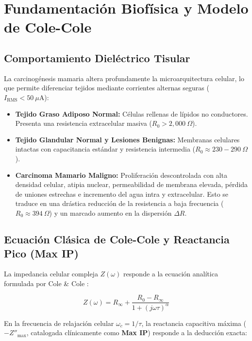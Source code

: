 \documentclass[11pt,a4paper]{article}
\begin{document}
\section{Fundamentación Biofísica y Modelo de Cole-Cole}

\subsection{Comportamiento Dieléctrico Tisular}
La carcinogénesis mamaria altera profundamente la microarquitectura celular, lo que permite diferenciar tejidos mediante corrientes alternas seguras ($I_{\text{RMS}} < 50\ \mu\text{A}$):
\begin{itemize}
    \item \textbf{Tejido Graso Adiposo Normal:} Células rellenas de lípidos no conductores. Presenta una resistencia extracelular masiva ($R_0 > 2,000\ \Omega$).
    \item \textbf{Tejido Glandular Normal y Lesiones Benignas:} Membranas celulares intactas con capacitancia estándar y resistencia intermedia ($R_0 \approx 230 - 290\ \Omega$).
    \item \textbf{Carcinoma Mamario Maligno:} Proliferación descontrolada con alta densidad celular, atipia nuclear, permeabilidad de membrana elevada, pérdida de uniones estrechas e incremento del agua intra y extracelular. Esto se traduce en una drástica reducción de la resistencia a baja frecuencia ($R_0 \approx 394\ \Omega$) y un marcado aumento en la dispersión $\Delta R$.
\end{itemize}

\subsection{Ecuación Clásica de Cole-Cole y Reactancia Pico (Max IP)}
La impedancia celular compleja $Z(\omega)$ responde a la ecuación analítica formulada por Cole \& Cole \cite{cole1941}:

\begin{equation}
    Z(\omega) = R_\infty + \frac{R_0 - R_\infty}{1 + (j \omega \tau)^\alpha}
    \label{eq:cole}
\end{equation}

En la frecuencia de relajación celular $\omega_c = 1/\tau$, la reactancia capacitiva máxima ($-Z''_{\max}$, catalogada clínicamente como \textbf{Max IP}) responde a la deducción exacta:
\end{document}

